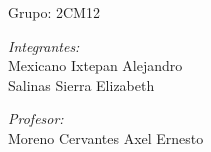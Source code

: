\begin{titlepage}
\begin{center}
		{ \Large Grupo: 2CM12} \\[1cm] 
		\noindent
		\begin{minipage}{0.5\textwidth}
			\begin{flushleft} \large
				\emph{Integrantes:}\\
			     Mexicano Ixtepan Alejandro \\
			     Salinas Sierra Elizabeth \\
			\end{flushleft}
		\end{minipage}%
		\begin{minipage}{0.5\textwidth}
			\begin{flushright} \large
				\emph{Profesor:} \\
			    Moreno Cervantes Axel Ernesto
			\end{flushright}
		\end{minipage}
		
		\vfill
		
		
	\end{center}
\end{titlepage}
